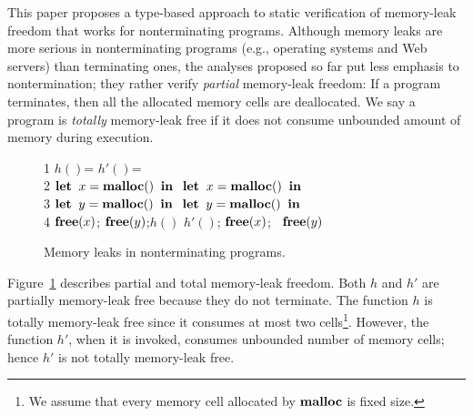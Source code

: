 This paper proposes a type-based approach to static verification of
memory-leak freedom that works for nonterminating programs.  Although
memory leaks are more serious in nonterminating programs (e.g.,
operating systems and Web servers) than terminating ones, the analyses
proposed so far put less emphasis to nontermination; they rather
verify \emph{partial} memory-leak freedom: If a program terminates,
then all the allocated memory cells are deallocated.  We say a program
is \emph{totally} memory-leak free if it does not consume unbounded
amount of memory during execution.


\begin{exmp}\label{ex:ex1}
\begin{figure}[h]
1  \Rtab $h()$= \dtb \dtb\dtb\Rtab$h'()$= \\
2  \dtb $\mathbf{let}\; \; x = \mathbf{malloc()}\;  \; \mathbf{in}\;$ \dtb \Rtab$\mathbf{let}\; \; x = \mathbf{malloc()}\;  \; \mathbf{in}\;$\\
3  \dtb $\mathbf{let}\; \; y = \mathbf{malloc()}\;  \; \mathbf{in}\;$ \dtb \Rtab$\mathbf{let}\; \; y = \mathbf{malloc()}\;  \; \mathbf{in}\;$\\
4  \dtb $\mathbf{free}(x)$; $\mathbf{free}(y) $;\;$h()$ \dtb \Rtab$h'()$; $\mathbf{free}(x)$; \ $\mathbf{free}(y)$
\caption{Memory leaks in nonterminating programs.}
\label{ex:np}
\end{figure}
Figure~\ref{ex:np} describes partial and total memory-leak freedom.
Both \(h\) and \(h'\) are partially memory-leak free because they do
not terminate.  The function \(h\) is totally memory-leak free since
it consumes at most two cells\footnote{We assume that every memory
  cell allocated by \(\mathbf{malloc}\) is fixed size.}.  However, the
function \(h'\), when it is invoked, consumes unbounded number of
memory cells; hence \(h'\) is not totally memory-leak free.
\end{exmp}

